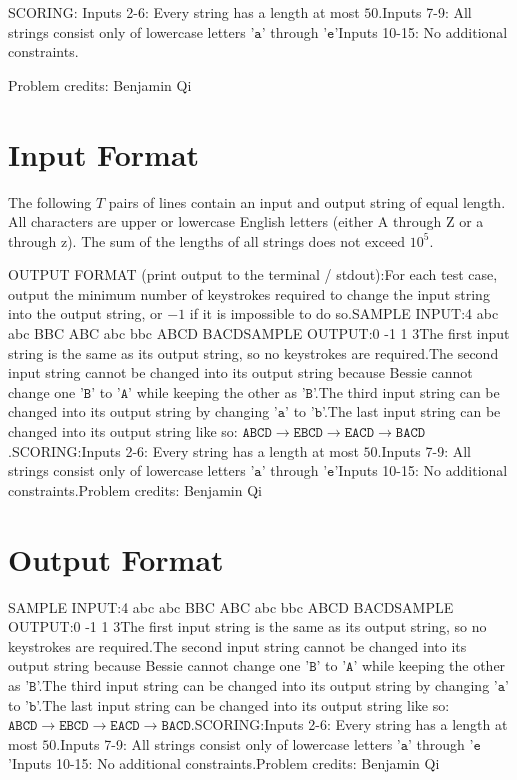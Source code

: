 \documentclass[12pt]{article}
\begin{document}
SCORING:
Inputs 2-6: Every string has a length at most $50$.Inputs 7-9: All strings consist only of lowercase letters '$\texttt{a}$'
through '$\texttt{e}$'Inputs 10-15: No additional constraints.


Problem credits: Benjamin Qi



\section*{Input Format}
The following $T$ pairs of lines contain an input and output string of equal
length.  All characters are upper or lowercase English letters (either A through
Z or a through z). The sum of the lengths of all strings does not exceed $10^5$.

OUTPUT FORMAT (print output to the terminal / stdout):For each test case, output the minimum number of keystrokes required to change
the input string into the output string, or $-1$ if it is impossible to do so.SAMPLE INPUT:4
abc
abc
BBC
ABC
abc
bbc
ABCD
BACDSAMPLE OUTPUT:0
-1
1
3The first input string is the same as its output string, so no keystrokes are
required.The second input string cannot be changed into its output string because Bessie
cannot change one '$\texttt{B}$' to '$\texttt{A}$' while keeping the other as
'$\texttt{B}$'.The third input string can be changed into its output string by changing
'$\texttt{a}$' to '$\texttt{b}$'.The last input string can be changed into its output string like so:
$\texttt{ABCD} \rightarrow \texttt{EBCD} \rightarrow \texttt{EACD} \rightarrow \texttt{BACD}$.SCORING:Inputs 2-6: Every string has a length at most $50$.Inputs 7-9: All strings consist only of lowercase letters '$\texttt{a}$'
through '$\texttt{e}$'Inputs 10-15: No additional constraints.Problem credits: Benjamin Qi

\section*{Output Format}
SAMPLE INPUT:4
abc
abc
BBC
ABC
abc
bbc
ABCD
BACDSAMPLE OUTPUT:0
-1
1
3The first input string is the same as its output string, so no keystrokes are
required.The second input string cannot be changed into its output string because Bessie
cannot change one '$\texttt{B}$' to '$\texttt{A}$' while keeping the other as
'$\texttt{B}$'.The third input string can be changed into its output string by changing
'$\texttt{a}$' to '$\texttt{b}$'.The last input string can be changed into its output string like so:
$\texttt{ABCD} \rightarrow \texttt{EBCD} \rightarrow \texttt{EACD} \rightarrow \texttt{BACD}$.SCORING:Inputs 2-6: Every string has a length at most $50$.Inputs 7-9: All strings consist only of lowercase letters '$\texttt{a}$'
through '$\texttt{e}$'Inputs 10-15: No additional constraints.Problem credits: Benjamin Qi
\end{document}
